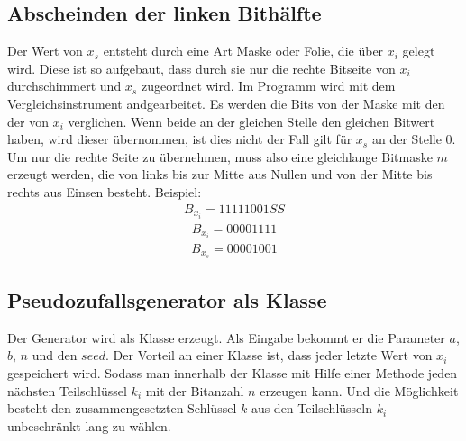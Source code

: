 \documentclass[10pt,a4paper]{article}
\begin{document}
\subsection{Abscheinden der linken Bithälfte}
Der Wert von $x_s$ entsteht durch eine Art Maske oder Folie, die über $x_i$ gelegt wird. Diese ist so aufgebaut, dass durch sie nur die rechte Bitseite von $x_i$ durchschimmert und $x_s$ zugeordnet wird. Im Programm wird mit dem Vergleichsinstrument \flqq and\frqq gearbeitet. Es werden die Bits von der Maske mit den der von $x_i$ verglichen. Wenn beide an der gleichen Stelle den gleichen Bitwert haben, wird dieser übernommen, ist dies nicht der Fall gilt für $x_s$ an der Stelle 0. Um nur die rechte Seite zu übernehmen, muss also eine gleichlange Bitmaske $m$ erzeugt werden, die von links bis zur Mitte aus Nullen und von der Mitte bis rechts aus Einsen besteht.
Beispiel:
\begin{align*}
    B_{x_i} = 1111 1001SS
\end{align*}
\begin{align*}
    B_{x_i} = 0000 1111
\end{align*}
\begin{align*}
    B_{x_s} = 0000 1001
\end{align*}
\subsection{Pseudozufallsgenerator als Klasse}
Der Generator wird als Klasse erzeugt. Als Eingabe bekommt er die Parameter $a$, $b$, $n$ und
den $seed$. Der Vorteil an einer Klasse ist, dass jeder letzte Wert von $x_i$ gespeichert wird. Sodass
man innerhalb der Klasse mit Hilfe einer Methode jeden nächsten Teilschlüssel $k_i$ mit der
Bitanzahl $n$ erzeugen kann. Und die Möglichkeit besteht den zusammengesetzten Schlüssel $k$
aus den Teilschlüsseln $k_i$ unbeschränkt lang zu wählen.
\end{document}
